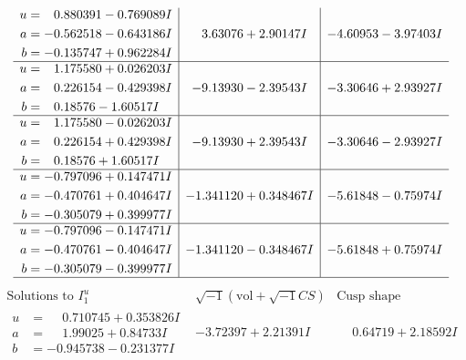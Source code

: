 \documentclass[1p]{elsarticle_modified}
\theoremstyle{definition}
\newcommand{\I}{\sqrt{-1}}
\begin{document}
$$\begin{array}{c|c|c}
\begin{aligned}
u &= \phantom{-}0.880391 - 0.769089 I \\
a &= -0.562518 - 0.643186 I \\
b &= -0.135747 + 0.962284 I\end{aligned}
 & \phantom{-}3.63076 + 2.90147 I & -4.60953 - 3.97403 I \\ \hline\begin{aligned}
u &= \phantom{-}1.175580 + 0.026203 I \\
a &= \phantom{-}0.226154 - 0.429398 I \\
b &= \phantom{-}0.18576 - 1.60517 I\end{aligned}
 & -9.13930 - 2.39543 I & -3.30646 + 2.93927 I \\ \hline\begin{aligned}
u &= \phantom{-}1.175580 - 0.026203 I \\
a &= \phantom{-}0.226154 + 0.429398 I \\
b &= \phantom{-}0.18576 + 1.60517 I\end{aligned}
 & -9.13930 + 2.39543 I & -3.30646 - 2.93927 I \\ \hline\begin{aligned}
u &= -0.797096 + 0.147471 I \\
a &= -0.470761 + 0.404647 I \\
b &= -0.305079 + 0.399977 I\end{aligned}
 & -1.341120 + 0.348467 I & -5.61848 - 0.75974 I \\ \hline\begin{aligned}
u &= -0.797096 - 0.147471 I \\
a &= -0.470761 - 0.404647 I \\
b &= -0.305079 - 0.399977 I\end{aligned}
 & -1.341120 - 0.348467 I & -5.61848 + 0.75974 I\\
 \hline 
 \end{array}$$\newpage$$\begin{array}{c|c|c}  
\text{Solutions to }I^u_{1}& \I (\text{vol} + \sqrt{-1}CS) & \text{Cusp shape}\\
 \hline 
\begin{aligned}
u &= \phantom{-}0.710745 + 0.353826 I \\
a &= \phantom{-}1.99025 + 0.84733 I \\
b &= -0.945738 - 0.231377 I\end{aligned}
 & -3.72397 + 2.21391 I & \phantom{-}0.64719 + 2.18592 I \\ \hline\begin{aligned}

\end{aligned}
\end{array}$$
\end{document}
